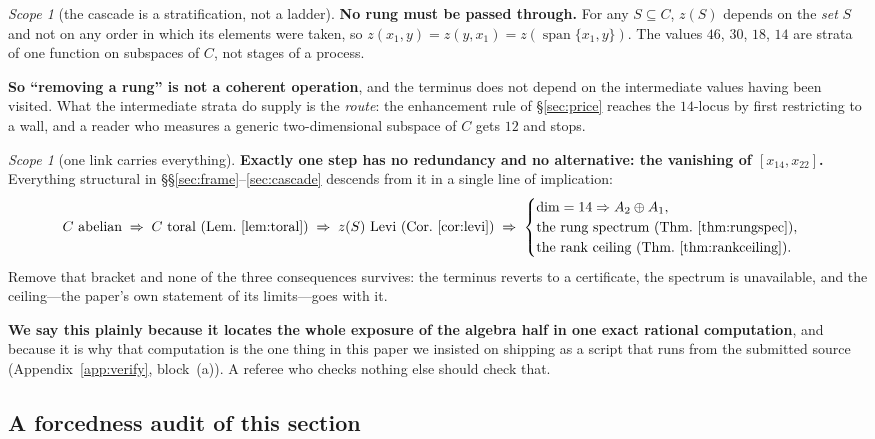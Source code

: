 \documentclass[11pt,reqno]{amsart}
\theoremstyle{plain}
\theoremstyle{definition}
\theoremstyle{remark}
\newtheorem{scope}[theorem]{Scope}
\begin{document}
\begin{scope}[the cascade is a stratification, not a ladder]\label{sc:notaladder}
\textbf{No rung must be passed through.} For any $S\subseteq C$, $z(S)$ depends on the
\emph{set} $S$ and not on any order in which its elements were taken, so
$z(x_1,y)=z(y,x_1)=z(\operatorname{span}\{x_1,y\})$. The values $46$, $30$, $18$, $14$
are strata of one function on subspaces of $C$, not stages of a process.

\textbf{So ``removing a rung'' is not a coherent operation}, and the terminus does not
depend on the intermediate values having been visited. What the intermediate strata do
supply is the \emph{route}: the enhancement rule of \S\ref{sec:price} reaches the
$14$-locus by first restricting to a wall, and a reader who measures a generic
two-dimensional subspace of $C$ gets $12$ and stops.
\end{scope}

\begin{scope}[one link carries everything]\label{sc:onebracket}
\textbf{Exactly one step has no redundancy and no alternative: the vanishing of
$[x_{14},x_{22}]$.} Everything structural in \S\S\ref{sec:frame}--\ref{sec:cascade}
descends from it in a single line of implication:
\[
  C\ \text{abelian}
  \;\Rightarrow\; C\ \text{toral (Lem.~\ref{lem:toral})}
  \;\Rightarrow\; z(S)\ \text{Levi (Cor.~\ref{cor:levi})}
  \;\Rightarrow\;
  \begin{cases}
    \dim=14\Rightarrow A_2\oplus A_1,\\
    \text{the rung spectrum (Thm.~\ref{thm:rungspec})},\\
    \text{the rank ceiling (Thm.~\ref{thm:rankceiling})}.
  \end{cases}
\]
Remove that bracket and none of the three consequences survives: the terminus reverts to
a certificate, the spectrum is unavailable, and the ceiling---the paper's own statement
of its limits---goes with it.

\textbf{We say this plainly because it locates the whole exposure of the algebra half in
one exact rational computation}, and because it is why that computation is the one thing
in this paper we insisted on shipping as a script that runs from the submitted source
(Appendix~\ref{app:verify}, block~(a)). A referee who checks nothing else should check
that.
\end{scope}

\subsection{A forcedness audit of this section}\label{sec:audit}
\end{document}
